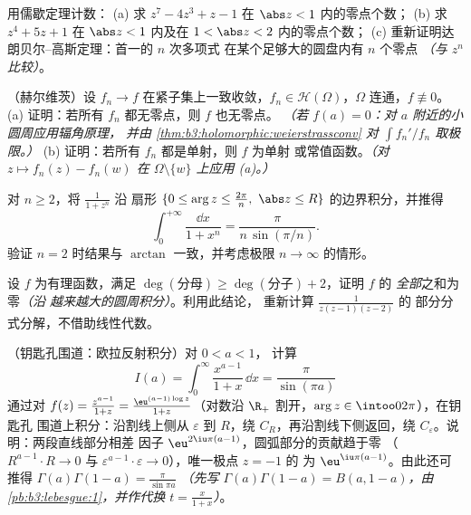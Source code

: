 \begin{exercise}[$\star\star$]\label{exo:b3:residues:7}
用儒歇定理计数：
(a) 求 $z^7 - 4z^3 + z - 1$ 在 $\abs z < 1$ 内的零点个数；
(b) 求 $z^4 + 5z + 1$ 在 $\abs z < 1$ 内及在 $1 <
\abs z < 2$ 内的零点个数；
(c) 重新证明达朗贝尔–高斯定理：首一的 $n$ 次多项式
在某个足够大的圆盘内有 $n$ 个零点 \emph{（与
$z^n$ 比较）}。
\end{exercise}

\begin{exercise}[$\star\star\star$]\label{exo:b3:residues:8}
（赫尔维茨）设 $f_n \to f$ 在紧子集上一致收敛，$f_n \in
\mathcal H(\Omega)$，$\Omega$ 连通，$f \not\equiv 0$。
(a) 证明：若所有 $f_n$ 都无零点，则 $f$ 也无零点。
\emph{（若 $f(a) = 0$：对 $a$ 附近的小圆周应用辐角原理，
并由 \cref{thm:b3:holomorphic:weierstrassconv} 对
$\int f_n'/f_n$ 取极限。）}
(b) 证明：若所有 $f_n$ 都是单射，则 $f$ 为单射
或常值函数。\emph{（对 $z \mapsto f_n(z) - f_n(w)$ 在
$\Omega\setminus\{w\}$ 上应用 (a)。）}
\end{exercise}

\begin{exercise}[$\star\star\star$]\label{exo:b3:residues:9}
对 $n \geq 2$，将 $\frac1{1 + z^n}$ 沿
扇形 $\{0 \leq \arg z \leq \frac{2\pi}n,\ \abs z
\leq R\}$ 的边界积分，并推得
\[
\int_0^{+\infty}\frac{\dd x}{1 + x^n} =
\frac{\pi}{n\,\sin(\pi/n)} .
\]
验证 $n = 2$ 时结果与 $\arctan$ 一致，并考虑极限 $n \to
\infty$ 的情形。
\end{exercise}

\begin{exercise}[$\star\star$]\label{exo:b3:residues:10}
设 $f$ 为有理函数，满足 $\deg(\text{分母})
\geq \deg(\text{分子}) + 2$，证明 $f$ 的
\emph{全部}之和为零\emph{（沿
越来越大的圆周积分）}。利用此结论，
重新计算 $\frac1{z(z-1)(z-2)}$ 的
部分分式分解，不借助线性代数。
\end{exercise}

\begin{exercise}[$\star\star\star$]\label{exo:b3:residues:11}
（钥匙孔围道：欧拉反射积分）对 $0 < a < 1$，
计算
\[
I(a) = \int_0^{\infty}\frac{x^{a-1}}{1 + x}\,\dd x =
\frac{\pi}{\sin(\pi a)}
\]
通过对 $f(z) = \frac{z^{a-1}}{1+z} =
\frac{\eu^{(a-1)\log z}}{1 + z}$（对数沿
$\R_+$ 割开，$\arg z \in \intoo0{2\pi}$），在钥匙孔
围道上积分：沿割线上侧从 $\varepsilon$ 到
$R$，绕 $C_R$，再沿割线下侧返回，绕
$C_\varepsilon$。说明：两段直线部分相差
因子 $\eu^{2\iu\pi(a-1)}$，圆弧部分的贡献趋于零
（$R^{a-1}\cdot R \to 0$ 与
$\varepsilon^{a-1}\cdot\varepsilon \to 0$），唯一极点 $z = -1$ 的
为 $\eu^{\iu\pi(a - 1)}$。由此还可推得
$\Gamma(a)\Gamma(1 - a) = \frac\pi{\sin\pi a}$ \emph{（先写
$\Gamma(a)\Gamma(1-a) = B(a, 1-a)$，由
\cref{pb:b3:lebesgue:1}，并作代换 $t =
\frac{x}{1+x}$）}。
\end{exercise}

